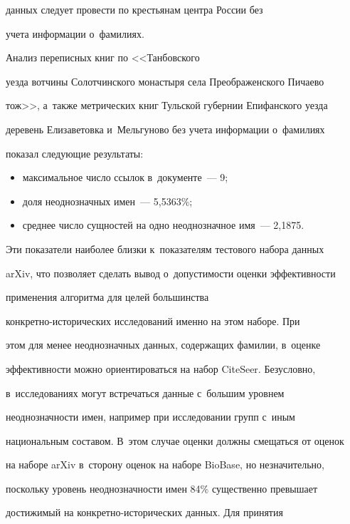 данных следует провести по крестьянам центра России без 


учета информации о~фамилиях. 


Анализ переписных книг по <<Танбовского 


уезда вотчины Солотчинского монастыря села Преображенского Пичаево 


тож>>, а~также мет\-ри\-че\-ских книг Тульской губернии Епифанского уезда 


деревень Елизаветовка и~Мельгуново без учета информации о~фамилиях 


показал сле\-ду\-ющие результаты: 


  \begin{itemize}


\item максимальное число ссылок в~документе~--- 9;


  \item доля неоднозначных имен~--- 5,5363\%;


  \item среднее число сущностей на одно неоднозначное имя~--- 2,1875.


  \end{itemize}


  


  Эти показатели наиболее близки к~показателям тестового набора данных 


arXiv, что позволяет сделать вывод о~до\-пус\-ти\-мости оценки эф\-фек\-тив\-ности 


применения алгоритма для целей большинства  


кон\-крет\-но-ис\-то\-ри\-че\-ских исследований именно на этом наборе. При 


этом для менее неоднозначных данных, содержащих фамилии, в~оценке 


эф\-фек\-тив\-ности можно ориентироваться на набор CiteSeer. Безусловно, 


в~исследованиях могут встречаться данные с~большим уровнем 


не\-од\-но\-знач\-ности имен, например при исследовании групп с~иным 


национальным со\-ста\-вом. В~этом случае оценки долж\-ны смещаться от оценок 


на наборе arXiv в~сторону оценок на наборе BioBase, но незначительно, 


поскольку уровень неоднозначности имен 84\% существенно превышает 


до\-сти\-жи\-мый на кон\-крет\-но-ис\-то\-ри\-че\-ских данных. Для принятия 


